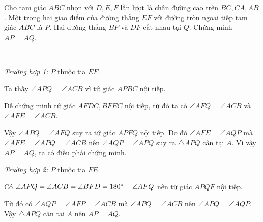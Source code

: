 \begin{prob}
	Cho tam giác $ABC$ nhọn với $D, E, F$ lần lượt là chân đường cao trên $BC, CA, AB$. Một trong hai giao điểm của đường thằng $EF$ với đường tròn ngoại tiếp tam giác $ABC$ là $P$. Hai đường thẳng $BP$ và $DF$ cắt nhau tại $Q$. Chứng minh $AP = AQ$.
\end{prob}

\begin{center}
 \ \ \ \ \ \ \ \ \ \ 
\end{center}

\textit{Trường hợp 1:} $P$ thuộc tia $EF$.

Ta thấy $\angle APQ = \angle ACB$ vì tứ giác $APBC$ nội tiếp.

Dễ chứng minh tứ giác $AFDC, BFEC$ nội tiếp, từ đó ta có $\angle AFQ = \angle ACB$ và $\angle AFE = \angle ACB$.

Vậy $\angle APQ = \angle AFQ$ suy ra tứ giác $APFQ$ nội tiếp. Do đó $\angle AFE = \angle AQP$ mà $\angle AFE = \angle APQ = \angle ACB$ nên $\angle AQP = \angle APQ$ suy ra $\triangle APQ$ cân tại $A$. Vì vậy $AP = AQ$, ta có điều phải chứng minh.

\textit{Trường hợp 2:} $P$ thuộc tia $FE$.

Có $\angle APQ = \angle ACB = \angle BFD = 180 \degree - \angle AFQ$ nên tứ giác $APQF$ nội tiếp.

Từ đó có $\angle AQP = \angle AFP = \angle ACB$ mà $\angle APQ = \angle ACB$ nên $\angle APQ = \angle AQP$. Vậy $\triangle APQ$ cân tại $A$ nên $AP = AQ$.